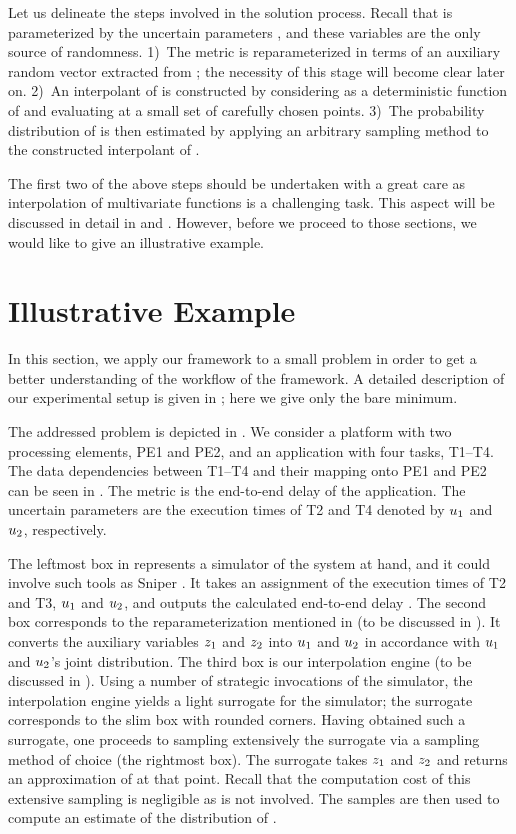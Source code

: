 Let us delineate the steps involved in the solution process. Recall that \g is
parameterized by the uncertain parameters \vu, and these variables are the only
source of randomness. 1)~The metric \g is reparameterized in terms of an
auxiliary random vector \vz extracted from \vu; the necessity of this stage will
become clear later on. 2)~An interpolant of \g is constructed by considering \g
as a deterministic function of \vz and evaluating \g at a small set of carefully
chosen points. 3)~The probability distribution of \g is then estimated by
applying an arbitrary sampling method to the constructed interpolant of \g.

The first two of the above steps should be undertaken with a great care as
interpolation of multivariate functions is a challenging task. This aspect will
be discussed in detail in  and . However,
before we proceed to those sections, we would like to give an illustrative
example.

\section{Illustrative Example}

In this section, we apply our framework to a small problem in order to get a
better understanding of the workflow of the framework. A detailed description of
our experimental setup is given in ; here we give only the
bare minimum.

The addressed problem is depicted in . We consider a platform with
two processing elements, PE1 and PE2, and an application with four tasks,
T1--T4. The data dependencies between T1--T4 and their mapping onto PE1 and PE2
can be seen in . The metric \g is the end-to-end delay of the
application. The uncertain parameters \vu are the execution times of T2 and T4
denoted by $u_1$ and $u_2$, respectively.

The leftmost box in  represents a simulator of the system at hand,
and it could involve such tools as Sniper \cite{carlson2011}. It takes an
assignment of the execution times of T2 and T3, $u_1$ and $u_2$, and outputs
the calculated end-to-end delay \g. The second box corresponds to the
reparameterization mentioned in  (to be discussed in
). It converts the auxiliary variables $z_1$ and $z_2$ into
$u_1$ and $u_2$ in accordance with $u_1$ and $u_2$'s joint distribution. The
third box is our interpolation engine (to be discussed in ).
Using a number of strategic invocations of the simulator, the interpolation
engine yields a light surrogate for the simulator; the surrogate corresponds to
the slim box with rounded corners. Having obtained such a surrogate, one
proceeds to sampling extensively the surrogate via a sampling method of choice
(the rightmost box). The surrogate takes $z_1$ and $z_2$ and returns an
approximation of \g at that point. Recall that the computation cost of this
extensive sampling is negligible as \g is not involved. The samples are then
used to compute an estimate of the distribution of \g.

